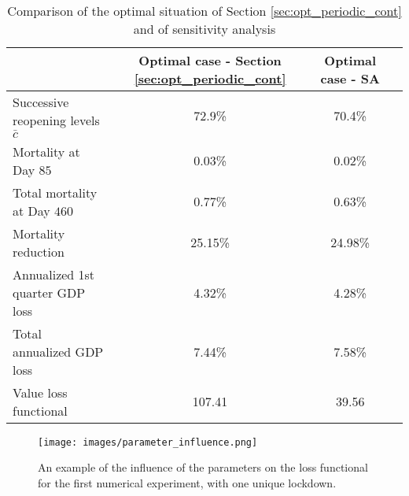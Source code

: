 \documentclass{amsart}
\begin{document}
\begin{table}[htbp]
  \centering
  \caption{Comparison of the optimal situation of Section \ref{sec:opt_periodic_cont} and of sensitivity analysis}
    \begin{tabular}{lccc}
          &  \multicolumn{1}{c}{Optimal case - Section \ref{sec:opt_periodic_cont} } & \multicolumn{1}{c}{Optimal case - SA } \\ \hline \vspace{0.1cm}
    Successive reopening levels $\bar{c}$ & 72.9\% & 70.4\%   \\  \vspace{0.1cm}   
   Mortality at Day $85$ & 0.03\%  &  0.02\%    \\ \vspace{0.1cm}
    Total mortality at Day $460$ & 0.77\% & 0.63\%   \\ \vspace{0.1cm}
    Mortality reduction & 25.15\% &  24.98\%  \\ \vspace{0.1cm}
    Annualized 1st quarter GDP loss & 4.32\%  & 4.28\%    \\ \vspace{0.1cm} Total annualized GDP loss & 7.44\%  & 7.58\%   \\ \vspace{0.1cm}   
     Value loss functional & 107.41 & 39.56  \\ \hline    
    \end{tabular}%
  \label{tab:sens_case3}%
\end{table}%

\begin{figure}[h!]
    \centering
    \texttt{[image: images/parameter\_influence.png]}
    \caption{An example of the influence of the parameters on the loss functional for the first numerical experiment, with one unique lockdown.}
    \label{parameter_influence}
\end{figure}
\end{document}
